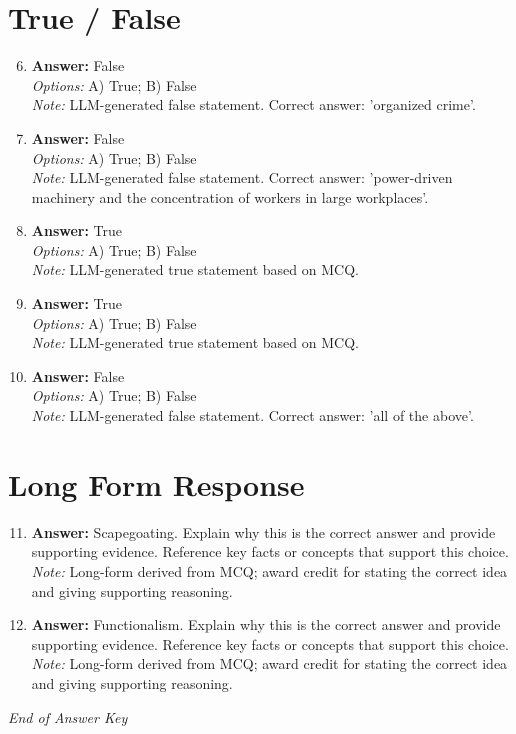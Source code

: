 \documentclass[12pt]{article}
\begin{document}
\section*{True / False}
\begin{enumerate}[label=\arabic*.]
\setcounter{enumi}{5}
\item \textbf{Answer:} False
\\ \textit{Options:} A) True; B) False
\\ \textit{Note:} LLM-generated false statement. Correct answer: 'organized crime'.
\item \textbf{Answer:} False
\\ \textit{Options:} A) True; B) False
\\ \textit{Note:} LLM-generated false statement. Correct answer: 'power-driven machinery and the concentration of workers in large workplaces'.
\item \textbf{Answer:} True
\\ \textit{Options:} A) True; B) False
\\ \textit{Note:} LLM-generated true statement based on MCQ.
\item \textbf{Answer:} True
\\ \textit{Options:} A) True; B) False
\\ \textit{Note:} LLM-generated true statement based on MCQ.
\item \textbf{Answer:} False
\\ \textit{Options:} A) True; B) False
\\ \textit{Note:} LLM-generated false statement. Correct answer: 'all of the above'.
\end{enumerate}

\section*{Long Form Response}
\begin{enumerate}[label=\arabic*.]
\setcounter{enumi}{10}
\item \textbf{Answer:} Scapegoating. Explain why this is the correct answer and provide supporting evidence. Reference key facts or concepts that support this choice.
\\ \textit{Note:} Long-form derived from MCQ; award credit for stating the correct idea and giving supporting reasoning.
\item \textbf{Answer:} Functionalism. Explain why this is the correct answer and provide supporting evidence. Reference key facts or concepts that support this choice.
\\ \textit{Note:} Long-form derived from MCQ; award credit for stating the correct idea and giving supporting reasoning.
\end{enumerate}

\vfill
\noindent\textit{End of Answer Key}
\end{document}
